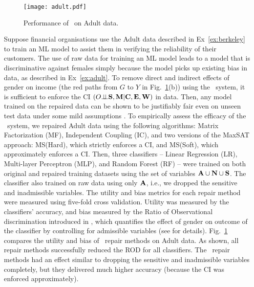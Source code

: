 \documentclass[11pt]{article}
\begin{document}
\begin{figure}[]  \centering
	\texttt{[image: adult.pdf]}
	\caption{\textmd{Performance of \sys\ on Adult data.}}
				\label{fig:adult}
\end{figure}
\vspace{-0.3cm}
\begin{example} \label{ex:capuchin} Suppose financial organisations use the Adult data described in Ex~\ref{ex:berkeley} to train an ML model to assist them in verifying the reliability of their customers. The use of raw data for training an ML model leads to a model that is discriminative against females simply because the model picks up existing bias in data, as described in Ex~\ref{ex:adult}. To remove direct and indirect effects of gender on income (the red paths from $G$ to $Y$ in Fig.~\ref{fig:adult}(b)) using the \sys\ system, it is sufficient to enforce the CI $(O \mbox{$\perp\!\!\!\perp$} {\mathbf{S}}, {\mathbf{M}}| {\mathbf{C}},{\mathbf{E}}, {\mathbf{W}})$ in data. Then, any model trained on the repaired data can be shown to be justifiably fair even on  unseen test data under some mild assumptions \cite{salimi2019interventional}. To empirically assess the efficacy of the \sys\ system, we repaired Adult data using the following \sys algorithms:  Matrix Factorization (MF), Independent Coupling (IC), and two versions of the MaxSAT approach: MS(Hard), which strictly enforces a CI, and MS(Soft), which approximately enforces a CI.  
Then, three classifiers -- Linear Regression (LR), Multi-layer Perceptron (MLP), and Random Forest (RF) -- were trained on both original and repaired training datasets using the set of variables $ {\mathbf{A}} \cup {\mathbf{N}} \cup {\mathbf{S}}$. The classifier also trained on raw data using only ${\mathbf{A}}$, i.e., we dropped the sensitive and inadmissible variables. The utility and bias metrics for each repair method were measured using five-fold cross validation. Utility was measured by the classifiers' accuracy, and bias measured by the Ratio of Observational discrimination introduced in \cite{salimi2019interventional}, which quantifies the effect of gender on outcome of the classifier by controlling for admissible variables (see \cite{salimi2019capuchin} for details).   Fig.~\ref{fig:adult} compares the  utility and bias of \sys\ repair methods on Adult data.  As shown, all repair methods successfully reduced
the ROD for all classifiers. The \sys\ repair methods had an effect similar to dropping the sensitive and inadmissible variables completely, but they delivered much higher accuracy (because the CI was enforced approximately).  %
\end{example}
\vspace{-0.3cm}
\end{document}

